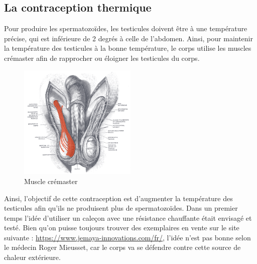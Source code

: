 \documentclass[12pt,a4paper]{report}
\begin{document}
\subsection{La contraception thermique}

Pour produire les spermatozoïdes, les testicules doivent être à une température précise, qui est inférieure de 2 degrés à celle de l'abdomen. \cite{Testicule2023}
Ainsi, pour maintenir la température des testicules à la bonne température, le corps utilise les muscles crémaster afin de rapprocher ou éloigner les testicules du corps. \cite{MuscleCremasterWikipedia}

\begin{figure}[h]
    \centering
    \includegraphics[width=0.5\textwidth]{images/scientiphique/Musculus_cremaster.png}
    \caption{Muscle crémaster}
    \label{fig:muscles-cremaster}
\end{figure}

Ainsi, l'objectif de cette contraception est d'augmenter la température des testicules afin qu'ils ne produisent plus de spermatozoïdes. \cite{wallachRoleTemperatureRegulation1988}
Dans un premier temps l'idée d'utiliser un caleçon avec une résistance chauffante était envisagé et testé. Bien qu'on puisse toujours trouver des exemplaires en vente sur le site suivante : \href{https://www.jemaya-innovations.com/fr/}{https://www.jemaya-innovations.com/fr/}, l'idée n'est pas bonne selon le médecin Roger Mieusset, car le corps va se défendre contre cette source de chaleur extérieure. \cite{guillaumedaudinContraceptesEnqueteDernier2022}
\end{document}
